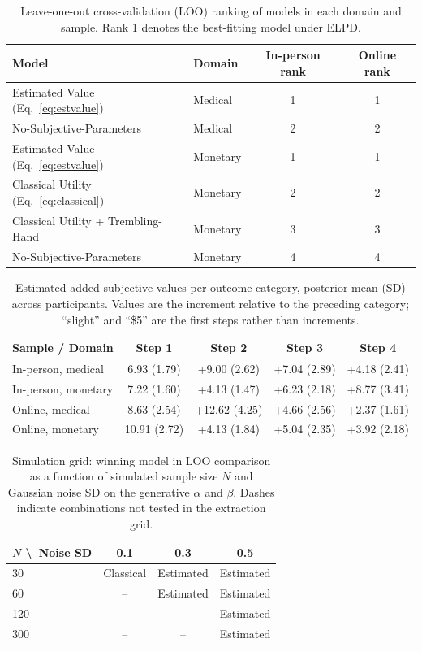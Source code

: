 \documentclass[11pt]{article}
\begin{document}
\begin{table}[htbp]
\centering
\caption{Leave-one-out cross-validation (LOO) ranking of models in each domain and sample. Rank 1 denotes the best-fitting model under ELPD.}
\label{tab:loo}
\begin{tabular}{llcc}
\toprule
Model & Domain & In-person rank & Online rank \\
\midrule
Estimated Value (Eq.~\ref{eq:estvalue})              & Medical  & 1 & 1 \\
No-Subjective-Parameters                             & Medical  & 2 & 2 \\
Estimated Value (Eq.~\ref{eq:estvalue})              & Monetary & 1 & 1 \\
Classical Utility (Eq.~\ref{eq:classical})           & Monetary & 2 & 2 \\
Classical Utility + Trembling-Hand                   & Monetary & 3 & 3 \\
No-Subjective-Parameters                             & Monetary & 4 & 4 \\
\bottomrule
\end{tabular}
\end{table}

\begin{table}[htbp]
\centering
\caption{Estimated added subjective values per outcome category, posterior mean (SD) across participants. Values are the increment relative to the preceding category; ``slight'' and ``\$5'' are the first steps rather than increments.}
\label{tab:values}
\begin{tabular}{lcccc}
\toprule
Sample / Domain & Step 1 & Step 2 & Step 3 & Step 4 \\
\midrule
In-person, medical  & 6.93 (1.79) & +9.00 (2.62) & +7.04 (2.89) & +4.18 (2.41) \\
In-person, monetary & 7.22 (1.60) & +4.13 (1.47) & +6.23 (2.18) & +8.77 (3.41) \\
Online, medical     & 8.63 (2.54) & +12.62 (4.25) & +4.66 (2.56) & +2.37 (1.61) \\
Online, monetary    & 10.91 (2.72) & +4.13 (1.84) & +5.04 (2.35) & +3.92 (2.18) \\
\bottomrule
\end{tabular}
\end{table}

\begin{table}[htbp]
\centering
\caption{Simulation grid: winning model in LOO comparison as a function of simulated sample size $N$ and Gaussian noise SD on the generative $\alpha$ and $\beta$. Dashes indicate combinations not tested in the extraction grid.}
\label{tab:sims}
\begin{tabular}{lccc}
\toprule
$N$ \textbackslash\ Noise SD & 0.1 & 0.3 & 0.5 \\
\midrule
30  & Classical & Estimated & Estimated \\
60  & --        & Estimated & Estimated \\
120 & --        & --        & Estimated \\
300 & --        & --        & Estimated \\
\bottomrule
\end{tabular}
\end{table}
\end{document}
